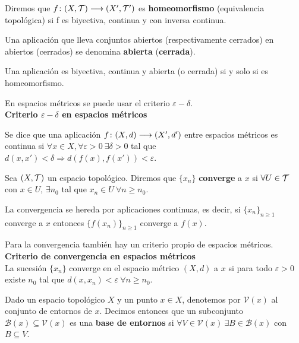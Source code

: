 \documentclass[GTS.tex]{subfiles}
\begin{document}
\begin{defi}Diremos que $f\colon{(X,\mathcal{T})}\longrightarrow{(X',\mathcal{T}')}$ es \textbf{homeomorfismo} (equivalencia topológica) si f es biyectiva, continua y con inversa continua.
\end{defi}

\begin{defi} Una aplicación que lleva conjuntos abiertos (respectivamente cerrados) en abiertos (cerrados) se denomina \textbf{abierta} (\textbf{cerrada}).
\end{defi}


\begin{prop} Una aplicación es biyectiva, continua y abierta (o cerrada) si y solo si es homeomorfismo.
\end{prop}


\vspace{0.5cm}

En espacios métricos se puede usar el criterio $\varepsilon-\delta$.\\
{\large \bf Criterio $\varepsilon-\delta$ en espacios métricos}

Se dice que una aplicación $f\colon{(X,d)}\longrightarrow{(X',d')}$ entre espacios métricos es continua si $\forall x\in X, \forall\varepsilon>0\ \exists\delta>0$ tal que $d(x,x')<\delta\Rightarrow d(f(x),f(x'))<\varepsilon$.

\vspace{0.5cm}


\begin{defi} Sea $(X,\mathcal{T})$ un espacio topológico. Diremos que $\{x_n\}$ \textbf{converge} a $x$ si $\forall U\in\mathcal{T}$ con $x\in U$, $\exists n_0$ tal que $x_n\in U\ \forall n\geq n_0$.
\end{defi}

La convergencia se hereda por aplicaciones continuas, es decir, si $\{x_n\}_{n\geq 1}$ converge a $x$ entonces $\{f(x_n)\}_{n\geq 1}$ converge a $f(x)$.

Para la convergencia también hay un criterio propio de espacios métricos.\\
{\large \bf Criterio de convergencia en espacios métricos}\\
La sucesión $\{x_n\}$ converge en el espacio métrico $(X,d)$ a $x$ si para todo $\varepsilon>0$ existe $n_0$ tal que $d(x,x_n)<\varepsilon\ \forall n\geq n_0$.

\begin{defi}
Dado un espacio topológico $X$ y un punto $x\in X$, denotemos por $\mathcal{V}(x)$ al conjunto de entornos de $x$. Decimos entonces que un subconjunto $\mathcal{B}(x)\subseteq\mathcal{V}(x)$ es una \textbf{base de entornos} si $\forall V\in\mathcal{V}(x)\ \exists B\in\mathcal{B}(x)$ con $B\subseteq V$. 
\end{defi}
\end{document}
